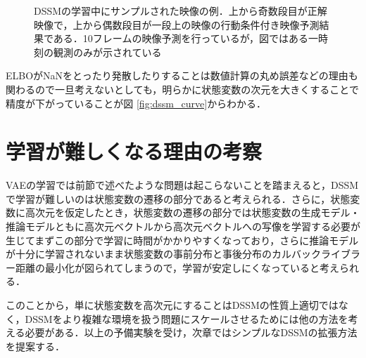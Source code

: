 \begin{figure}[tp]
  \begin{center}
     \quad
    \caption[DSSMの学習中にサンプルされた映像の例]{DSSMの学習中にサンプルされた映像の例．上から奇数段目が正解映像で，上から偶数段目が一段上の映像の行動条件付き映像予測結果である．10フレームの映像予測を行っているが，図ではある一時刻の観測のみが示されている}
  \end{center}
  \label{fig:dssm_base}

\end{figure}

ELBOがNaNをとったり発散したりすることは数値計算の丸め誤差などの理由も関わるので一旦考えないとしても，明らかに状態変数の次元を大きくすることで精度が下がっていることが図 \ref{fig:dssm_curve}からわかる．

\section{学習が難しくなる理由の考察}
VAEの学習では前節で述べたような問題は起こらないことを踏まえると，DSSMで学習が難しいのは状態変数の遷移の部分であると考えられる．さらに，状態変数に高次元を仮定したとき，状態変数の遷移の部分では状態変数の生成モデル・推論モデルともに高次元ベクトルから高次元ベクトルへの写像を学習する必要が生じてまずこの部分で学習に時間がかかりやすくなっており，さらに推論モデルが十分に学習されないまま状態変数の事前分布と事後分布のカルバックライブラー距離の最小化が図られてしまうので，学習が安定しにくなっていると考えられる．

このことから，単に状態変数を高次元にすることはDSSMの性質上適切ではなく，DSSMをより複雑な環境を扱う問題にスケールさせるためには他の方法を考える必要がある．以上の予備実験を受け，次章ではシンプルなDSSMの拡張方法を提案する．

